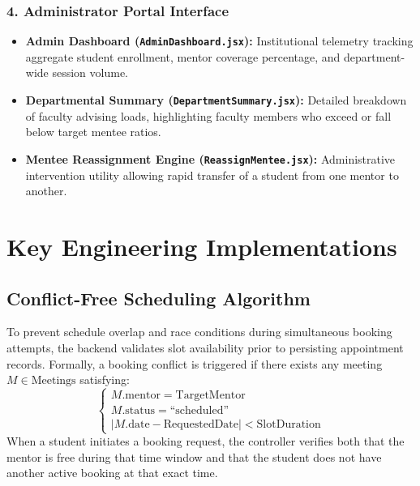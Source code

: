 \documentclass[11pt,a4paper]{article}
\begin{document}
\subsubsection{4. Administrator Portal Interface}
\begin{itemize}[leftmargin=1.4em, itemsep=0.2em]
  \item \textbf{Admin Dashboard (\texttt{AdminDashboard.jsx}):} Institutional telemetry tracking aggregate student enrollment, mentor coverage percentage, and department-wide session volume.
  \item \textbf{Departmental Summary (\texttt{DepartmentSummary.jsx}):} Detailed breakdown of faculty advising loads, highlighting faculty members who exceed or fall below target mentee ratios.
  \item \textbf{Mentee Reassignment Engine (\texttt{ReassignMentee.jsx}):} Administrative intervention utility allowing rapid transfer of a student from one mentor to another.
\end{itemize}

\section{Key Engineering Implementations}

\subsection{Conflict-Free Scheduling Algorithm}
To prevent schedule overlap and race conditions during simultaneous booking attempts, the backend validates slot availability prior to persisting appointment records. Formally, a booking conflict is triggered if there exists any meeting $M \in \text{Meetings}$ satisfying:
\begin{equation}
\begin{cases}
M.\text{mentor} = \text{TargetMentor} \\
M.\text{status} = \text{``scheduled''} \\
|M.\text{date} - \text{RequestedDate}| < \text{SlotDuration}
\end{cases}
\end{equation}
When a student initiates a booking request, the controller verifies both that the mentor is free during that time window and that the student does not have another active booking at that exact time.
\end{document}
